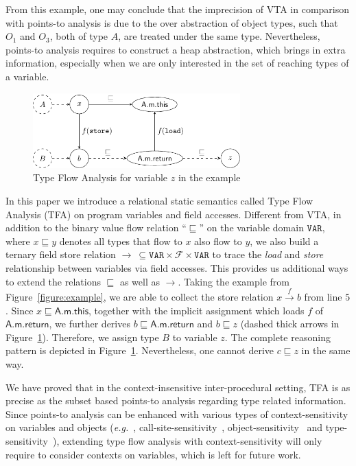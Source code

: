 \documentclass{fac}
\newcommand\eg{\textit{e.g.\ }}
\newcommand\Var{\mathtt{VAR}}
\newcommand{\Field}{\mathcal{F}}
\newcommand{\less}{\sqsubseteq}
\newcommand{\hflow}{\longrightarrow}
\newcommand{\lhflow}[1]{\stackrel{#1}{\hflow}}
\begin{document}
From this example, one may conclude that the imprecision of VTA in comparison with points-to analysis is due to the over abstraction of object types, such that $O_1$ and $O_3$, both of type $A$, are treated under the same type. Nevertheless, points-to analysis requires to construct a heap abstraction, which brings in extra information, especially when we are only interested in the set of reaching types of a variable.

\begin{figure}
\centering
\includegraphics[width=8cm]{tfa.pdf}
\caption{Type Flow Analysis for variable $z$ in the example}\label{fig:tfa}
\end{figure}

In this paper we introduce a relational static semantics called Type Flow Analysis (TFA) on program variables and field accesses. Different from VTA, in addition to the binary value flow relation ``$\less$'' on the variable domain $\Var$, where $x\less y$ denotes all types that flow to $x$ also flow to $y$, we also build a ternary field store relation $\rightarrow\ \subseteq\Var\times\Field\times\Var$ to trace the \emph{load} and \emph{store} relationship between variables via field accesses. This provides us additional ways to extend the relations $\less$ as well as $\rightarrow$. %
Taking the example from Figure~\ref{figure:example}, we are able to collect the store relation $x\lhflow{f}b$ from line $5$. Since $x\less \textsf{A.m.this}$, together with the implicit assignment which loads $f$ of $\textsf{A.m.return}$, we further derives $b\less\textsf{A.m.return}$ and $b\less z$ (dashed thick arrows in Figure~\ref{fig:tfa}). Therefore, we assign type $B$ to variable $z$. The complete reasoning pattern is depicted in Figure~\ref{fig:tfa}. Nevertheless, one cannot derive $c\less z$ in the same way.

We have proved that in the context-insensitive inter-procedural setting, TFA is as precise as the subset based points-to analysis regarding type related information. Since points-to analysis can be enhanced with various types of context-sensitivity on variables and objects (\eg, call-site-sensitivity~\cite{Shivers91,Kastrinis2013}, object-sensitivity~\cite{Milanova2005,Smaragdakis11,Tan16} and type-sensitivity~\cite{Smaragdakis11}), extending type flow analysis with context-sensitivity will only require to consider contexts on variables, which is left for future work.
\end{document}
